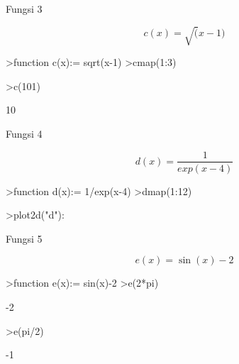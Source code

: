 \documentclass[12pt,arial,letterpaper]{book}
\begin{document}
\begin{eulercomment}
\begin{eulercomment}
\begin{eulercomment}
\begin{eulercomment}
\begin{eulercomment}
\begin{eulercomment}
\begin{eulercomment}
\begin{eulercomment}
\begin{eulercomment}
\begin{eulercomment}
\begin{eulercomment}
\begin{eulercomment}
\begin{eulercomment}
\begin{eulercomment}
\begin{eulercomment}
\begin{eulercomment}
\begin{eulercomment}
\begin{eulercomment}
\begin{eulercomment}
Fungsi 3\\
\end{eulercomment}
\begin{eulerformula}
\[
c(x)=\sqrt(x-1)
\]
\end{eulerformula}
\begin{eulerprompt}
>function c(x):= sqrt(x-1)
>cmap(1:3)
\end{eulerprompt}
\begin{euleroutput}
  [0,  1,  1.41421]
\end{euleroutput}
\begin{eulerprompt}
>c(101)
\end{eulerprompt}
\begin{euleroutput}
  10
\end{euleroutput}
\begin{eulercomment}
Fungsi 4\\
\end{eulercomment}
\begin{eulerformula}
\[
d(x)= \frac{1}{exp(x-4)}
\]
\end{eulerformula}
\begin{eulerprompt}
>function d(x):= 1/exp(x-4)
>dmap(1:12)
\end{eulerprompt}
\begin{euleroutput}
  [20.0855,  7.38906,  2.71828,  1,  0.367879,  0.135335,  0.0497871,
  0.0183156,  0.00673795,  0.00247875,  0.000911882,  0.000335463]
\end{euleroutput}
\begin{eulerprompt}
>plot2d("d"):
\end{eulerprompt}
\begin{eulercomment}
Fungsi 5\\
\end{eulercomment}
\begin{eulerformula}
\[
e(x)=\sin(x)-2
\]
\end{eulerformula}
\begin{eulerprompt}
>function e(x):= sin(x)-2
>e(2*pi)
\end{eulerprompt}
\begin{euleroutput}
  -2
\end{euleroutput}
\begin{eulerprompt}
>e(pi/2)
\end{eulerprompt}
\begin{euleroutput}
  -1
\end{euleroutput}

\end{eulercomment}
\end{eulercomment}
\end{eulercomment}
\end{eulercomment}
\end{eulercomment}
\end{eulercomment}
\end{eulercomment}
\end{eulercomment}
\end{eulercomment}
\end{eulercomment}
\end{eulercomment}
\end{eulercomment}
\end{eulercomment}
\end{eulercomment}
\end{eulercomment}
\end{eulercomment}
\end{eulercomment}
\end{eulercomment}
\end{document}
